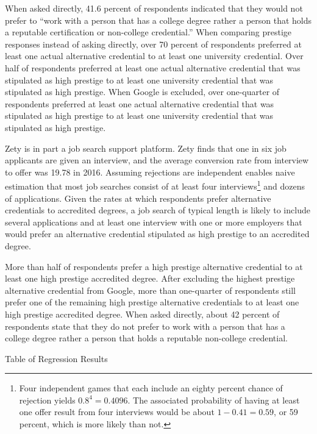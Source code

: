 \documentclass[review]{elsarticle}
\begin{document}
When asked directly, 41.6 percent of respondents indicated that they would not prefer to
``work with a person that has a college degree rather a person that holds a reputable certification or non-college credential.''
When comparing prestige responses instead of asking directly,
over 70 percent of respondents preferred at least one actual alternative credential to at least one university credential.
Over half of respondents preferred at least one actual alternative credential that was stipulated as high prestige
to at least one university credential that was stipulated as high prestige.
When Google is excluded, over one-quarter of respondents preferred at least one actual alternative credential that was stipulated as high prestige
to at least one university credential that was stipulated as high prestige.

Zety is in part a job search support platform.
Zety finds that one in six job applicants are given an interview,
and the average conversion rate from interview to offer was 19.78 in 2016\cite{turczynski_2021}.
Assuming rejections are independent enables naive estimation that most job searches consist of at least four interviews\footnote{
    Four independent games that each include an eighty percent chance of rejection yields $0.8^4 = 0.4096$.
    The associated probability of having at least one offer result from four interviews would be about $1 - 0.41 = 0.59$,
    or 59 percent, which is more likely than not.
} and dozens of applications.
Given the rates at which respondents prefer alternative credentials to accredited degrees,
a job search of typical length is likely to include several applications and at least one interview
with one or more employers that would prefer an alternative credential stipulated as high prestige to an accredited degree.

More than half of respondents prefer a high prestige alternative credential to at least one high prestige accredited degree.
After excluding the highest prestige alternative credential from Google,
more than one-quarter of respondents still prefer one of the remaining high prestige alternative credentials to at least one high prestige accredited degree.
When asked directly, about 42 percent of respondents state that they do not prefer
to work with a person that has a college degree rather a person that holds a reputable non-college credential.

\begin{table}
    \caption{Table of Regression Results}
    \resizebox{\columnwidth}{!}{
        
    }
    \label{tab:table_regs}
\end{table}
\end{document}
